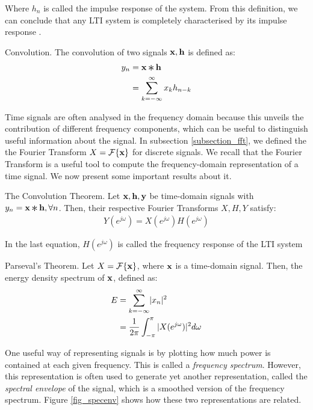 \documentclass[../main.tex]{subfiles}
\begin{document}
\par Where $h_{n}$ is called the impulse response of the system. From this definition, we can conclude that any LTI system is completely characterised by its impulse response \cite{Oppenheim2010}.  
\begin{definition}{Convolution.} \label{def_convolution}
The convolution of two signals $\mathbf{x, h}$ is defined as:
\begin{align*}
y_n &= \V{x} \Conv \V{h}\\
&= \sum_{k=-\infty}^{\infty}x_kh_{n-k}
\end{align*}
\end{definition}
\par Time signals are often analysed in the frequency domain because this unveils the contribution of different frequency components, which can be useful to distinguish useful information about the signal. In subsection \ref{subsection_fft}, we defined the the Fourier Transform $X = \mathcal{F}\{\mathbf{x}\}$ for discrete signals. We recall that the Fourier Transform is a useful tool to compute the frequency-domain representation of a time signal. We now present some important results about it.
\begin{theorem}{The Convolution Theorem.} \label{theo_conv}
Let $\mathbf{x, h, y}$ be time-domain signals with $y_n = \V{x}\Conv\V{h}, \forall n$. Then, their respective Fourier Transforms $X, H, Y$ satisfy:
\begin{align*}
Y(e^{j\omega}) = X(e^{j\omega})H(e^{j\omega})
\end{align*}
\end{theorem}
\par In the last equation, $H(e^{j\omega})$ is called the frequency response of the LTI system
\begin{theorem}{Parseval's Theorem.} \label{theo_parseval}
Let $X = \mathcal{F}\{\mathbf{x}\}$, where $\mathbf{x}$ is a time-domain signal. Then, the energy density spectrum of $\mathbf{x}$, defined as:
\begin{align*}
E &= \sum_{k=-\infty}^{\infty}\lvert x_n\rvert^2\\
&= \frac{1}{2\pi}\int_{-\pi}^\pi{\lvert X(e^{j\omega})\rvert^2d\omega}
\end{align*}
\end{theorem}
\par One useful way of representing signals is by plotting how much power is contained at each given frequency. This is called a \emph{frequency spectrum}. However, this representation is often used to generate yet another representation, called the \emph{spectral envelope} of the signal, which is a smoothed version of the frequency spectrum. Figure \ref{fig_specenv} shows how these two representations are related.
\end{document}
